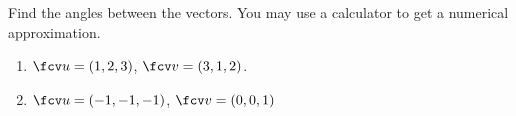 Find the angles between the vectors. You may use a calculator to get a numerical approximation.

\begin{enumerate}
\item $\fcv u=(1,2,3 )$, $\fcv v=(3,1,2 )$.

\item $\fcv u=( -1,-1,-1 )$, $\fcv v=( 0,0,1 )$
\end{enumerate}

